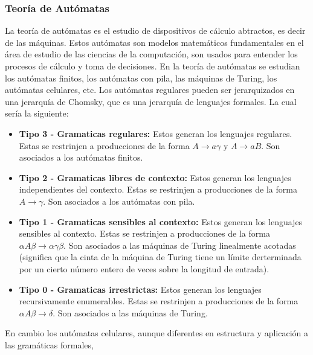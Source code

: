 \subsubsection{Teor\'ia de Aut\'omatas}
    \label{sec:TeoriaAutomatas}
    La teor\'ia de aut\'omatas es el estudio de dispositivos de c\'alculo abtractos, es decir de las m\'aquinas.\cite{Hopcroft1979}
        Estos aut\'omatas son modelos matem\'aticos fundamentales en el \'area de estudio de las ciencias de la computaci\'on, 
        son usados para entender los procesos de c\'alculo y toma de decisiones. En la teor\'ia de aut\'omatas se estudian
        los aut\'omatas finitos, los aut\'omatas con pila, las m\'aquinas de Turing, los aut\'omatas celulares, etc.
        Los aut\'omatas regulares pueden ser jerarquizados en una jerarqu\'ia de Chomsky\cite{Aranda2006}, que es una jerarqu\'ia de lenguajes formales.
        La cual ser\'ia la siguiente:
        \begin{itemize}
            \item \textbf{Tipo 3 - Gramaticas regulares:} Estos generan los lenguajes regulares.
                Estas se restrinjen a producciones de la forma $A \rightarrow a\gamma$ y $A \rightarrow aB$. Son 
                asociados a los aut\'omatas finitos.
            \item \textbf{Tipo 2 - Gramaticas libres de contexto:} Estos generan los lenguajes independientes del contexto.
                Estas se restrinjen a producciones de la forma $A \rightarrow \gamma$. Son asociados a los aut\'omatas con pila.
            \item \textbf{Tipo 1 - Gramaticas sensibles al contexto:} Estos generan los lenguajes sensibles al contexto.
                Estas se restrinjen a producciones de la forma ${\alpha}A{\beta} \rightarrow {\alpha}{\gamma}{\beta}$. 
                Son asociados a las m\'aquinas de Turing linealmente acotadas (significa que la cinta de la m\'aquina de Turing
                tiene un l\'imite derterminada por un cierto n\'umero entero de veces sobre la longitud de entrada).
            \item \textbf{Tipo 0 - Gramaticas irrestrictas:} Estos generan los lenguajes recursivamente enumerables.
                Estas se restrinjen a producciones de la forma ${\alpha}A{\beta} \rightarrow {\delta}$. Son asociados a las m\'aquinas de Turing.
        \end{itemize}
    \vskip 0.5cm
    En cambio los aut\'omatas celulares, aunque diferentes en estructura y aplicaci\'on a las gram\'aticas formales, 
